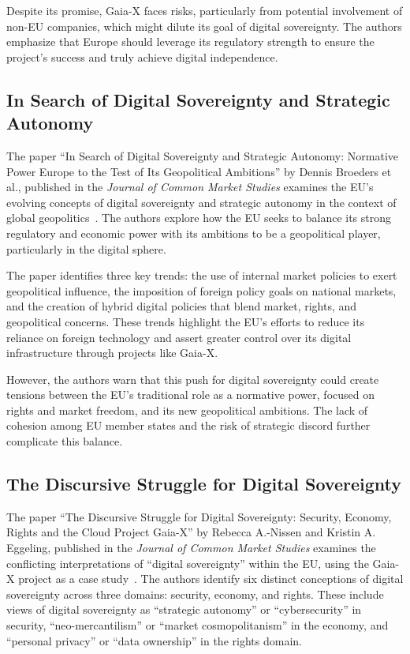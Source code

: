 Despite its promise, Gaia-X faces risks, particularly from potential involvement of non-EU companies, which might dilute its goal of digital sovereignty.
The authors emphasize that Europe should leverage its regulatory strength to ensure the project's success and truly achieve digital independence.

\subsection{In Search of Digital Sovereignty and Strategic Autonomy}\label{subsec:in-search-of-digital-sovereignty-and-strategic-autonomy}

The paper ``In Search of Digital Sovereignty and Strategic Autonomy: Normative Power Europe to the Test of Its Geopolitical Ambitions'' by Dennis Broeders et al., published in the \textit{Journal of Common Market Studies} examines the EU's evolving concepts of digital sovereignty and strategic autonomy in the context of global geopolitics~\cite{digital_sovereignty_and_strategic_autonomy}.
The authors explore how the EU seeks to balance its strong regulatory and economic power with its ambitions to be a geopolitical player, particularly in the digital sphere.

The paper identifies three key trends: the use of internal market policies to exert geopolitical influence, the imposition of foreign policy goals on national markets, and the creation of hybrid digital policies that blend market, rights, and geopolitical concerns.
These trends highlight the EU's efforts to reduce its reliance on foreign technology and assert greater control over its digital infrastructure through projects like Gaia-X.

However, the authors warn that this push for digital sovereignty could create tensions between the EU’s traditional role as a normative power, focused on rights and market freedom, and its new geopolitical ambitions.
The lack of cohesion among EU member states and the risk of strategic discord further complicate this balance.

\subsection{The Discursive Struggle for Digital Sovereignty}\label{subsec:the-discursive-struggle-for-digital-sovereignty}

The paper ``The Discursive Struggle for Digital Sovereignty: Security, Economy, Rights and the Cloud Project Gaia-X'' by Rebecca A.-Nissen and Kristin A. Eggeling, published in the \textit{Journal of Common Market Studies} examines the conflicting interpretations of ``digital sovereignty'' within the EU, using the Gaia-X project as a case study~\cite{discursive_struggle_for_digital_sovereignty}.
The authors identify six distinct conceptions of digital sovereignty across three domains: security, economy, and rights.
These include views of digital sovereignty as ``strategic autonomy'' or ``cybersecurity'' in security, ``neo-mercantilism'' or ``market cosmopolitanism'' in the economy, and ``personal privacy'' or ``data ownership'' in the rights domain.

